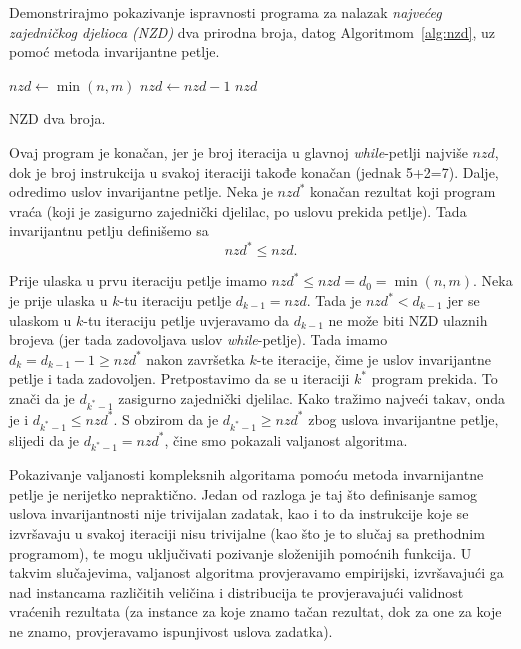 \begin{example}
Demonstrirajmo   pokazivanje ispravnosti programa za nalazak \textit{najvećeg zajedničkog djelioca (NZD)} dva prirodna broja, datog   Algoritmom~\ref{alg:nzd}, uz pomoć metoda invarijantne petlje.


\begin{algorithm}
	\begin{algorithmic}[1]
		\State $nzd \gets \min(n, m)$
		    \State $nzd \gets nzd - 1$
		\EndWhile
		\State \Return $nzd$
		\EndProcedure
	\end{algorithmic}
   \caption{NZD dva broja.} \label{alg:nzd}
\end{algorithm}

Ovaj program je konačan, jer je broj iteracija u glavnoj \emph{while}-petlji najviše $nzd$, dok je broj instrukcija u svakoj iteraciji takođe konačan (jednak 5+2=7). Dalje, odredimo uslov invarijantne petlje. Neka je ${nzd}^*$ konačan rezultat koji program vraća (koji je zasigurno zajednički djelilac, po uslovu prekida petlje). Tada  invarijantnu petlju definišemo sa 
$$ nzd^* \leq nzd.$$

Prije ulaska u prvu iteraciju petlje imamo $nzd^* \leq nzd = d_0 = \min(n, m)$. 
Neka je prije ulaska u $k$-tu iteraciju petlje $d_{k-1} = nzd$. Tada je  $nzd^* < d_{k-1}$ jer se  ulaskom u $k$-tu iteraciju petlje uvjeravamo da $d_{k-1}$ ne može biti NZD ulaznih brojeva (jer tada zadovoljava uslov \textit{while}-petlje). Tada imamo $d_{k} = d_{k-1} -1 \geq nzd^*$ nakon završetka $k$-te iteracije, čime je uslov invarijantne petlje i tada zadovoljen.   Pretpostavimo da se u iteraciji $k^*$ program prekida. To znači da je $d_{k^*-1}$ zasigurno zajednički djelilac. Kako tražimo najveći takav, onda je i $d_{k^*-1} \leq nzd^*$. S obzirom da je  $d_{k^*-1} \geq nzd^*$ zbog uslova invarijantne petlje, slijedi da je 
$d_{k^*-1} = nzd^*$, čine smo pokazali valjanost algoritma.
\end{example}
Pokazivanje valjanosti kompleksnih algoritama pomoću metoda invarnijantne petlje je nerijetko  nepraktično. Jedan od razloga je taj što definisanje samog uslova invarijantnosti nije trivijalan zadatak, kao  i to da instrukcije koje se izvršavaju u svakoj iteraciji nisu trivijalne  (kao što je to slučaj sa prethodnim programom), te mogu uključivati  pozivanje složenijih pomoćnih funkcija. U takvim slučajevima, valjanost algoritma provjeravamo empirijski, izvršavajući ga nad instancama različitih veličina i distribucija te provjeravajući  validnost vraćenih rezultata (za instance za koje znamo tačan rezultat, dok za one za koje ne znamo, provjeravamo ispunjivost uslova zadatka). 

